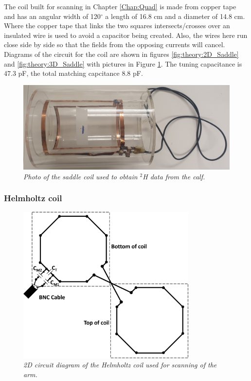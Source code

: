 The coil built for scanning in Chapter \ref{Chap:Quad} is made from copper tape and has an angular width of 120$^\circ$ a length of 16.8 cm and a diameter of 14.8 cm. Where the copper tape that links the two squares intersects/crosses over an insulated wire is used to avoid a capacitor being created. Also, the wires here run close side by side so that the fields from the opposing currents will cancel. Diagrams of the circuit for the coil are shown in figures \ref{fig:theory:2D_Saddle} and \ref{fig:theory:3D_Saddle} with pictures in Figure \ref{fig:theory:Saddle_pic}. The tuning capacitance is 47.3 pF, the total matching capcitance 8.8 pF.

\begin{figure}
    \centering
    \includegraphics[width=1\textwidth]{Figures/Theory/Saddle_Coil.jpg}
    \caption{\textit{Photo of the saddle coil used to obtain $^2$H data from the calf.}}
    \label{fig:theory:Saddle_pic}
\end{figure}

\subsubsection{Helmholtz coil}

\begin{figure}
    \centering
    \includegraphics[width=0.8\textwidth]{Figures/Theory/Planar_Helmholtz.png}
    \caption{\textit{2D circuit diagram of the Helmholtz coil used for scanning of the arm.}}
    \label{fig:theory:2D_Helmholtz}
\end{figure}


